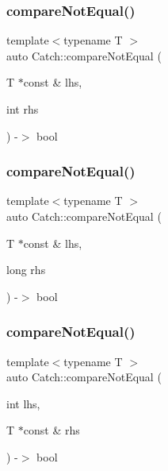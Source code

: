 \mbox{\label{namespace_catch_aa81c95898f22dce1f61d7710e495d1ee}} 
\subsubsection{\texorpdfstring{compare\+Not\+Equal()}{compareNotEqual()}\hspace{0.1cm}{\footnotesize\ttfamily [2/5]}}
{\footnotesize\ttfamily template$<$typename T $>$ \\
auto Catch\+::compare\+Not\+Equal (\begin{DoxyParamCaption}\item[{T $\ast$const \&}]{lhs,  }\item[{int}]{rhs }\end{DoxyParamCaption}) -\/$>$ bool }

\mbox{\label{namespace_catch_adad6539b3780b9a8953221efd038e2e4}} 
\subsubsection{\texorpdfstring{compare\+Not\+Equal()}{compareNotEqual()}\hspace{0.1cm}{\footnotesize\ttfamily [3/5]}}
{\footnotesize\ttfamily template$<$typename T $>$ \\
auto Catch\+::compare\+Not\+Equal (\begin{DoxyParamCaption}\item[{T $\ast$const \&}]{lhs,  }\item[{long}]{rhs }\end{DoxyParamCaption}) -\/$>$ bool }

\mbox{\label{namespace_catch_adb4b3e912b89a987025ca28cf0c92ba8}} 
\subsubsection{\texorpdfstring{compare\+Not\+Equal()}{compareNotEqual()}\hspace{0.1cm}{\footnotesize\ttfamily [4/5]}}
{\footnotesize\ttfamily template$<$typename T $>$ \\
auto Catch\+::compare\+Not\+Equal (\begin{DoxyParamCaption}\item[{int}]{lhs,  }\item[{T $\ast$const \&}]{rhs }\end{DoxyParamCaption}) -\/$>$ bool }

